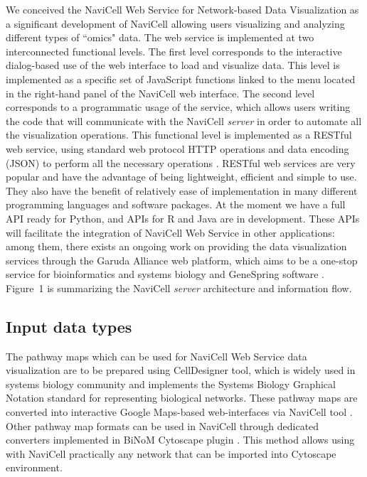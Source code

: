 \documentclass[a4,center,fleqn]{NAR}
\begin{document}
We conceived the NaviCell Web Service for Network-based Data Visualization
as a significant development of NaviCell \cite{kuperstein2013navicell}
allowing users visualizing and analyzing different types of ``omics" data. The web service
is implemented at two interconnected functional levels.
The first level corresponds to the interactive dialog-based
use of the web interface to load and visualize data. This level is implemented
as a specific set of JavaScript functions linked to the menu located
in the right-hand panel of the NaviCell web interface. The second level corresponds to a
programmatic usage of the service, which allows users writing the code that will
communicate with the NaviCell \emph{server} in order to automate all the
visualization operations. This functional level is implemented as a RESTful web
service, using standard web protocol HTTP operations and data encoding (JSON)
to perform all the necessary operations \cite{fielding2002principled}.
RESTful web services are very popular and have the advantage of being
lightweight, efficient and simple to use. They also have the benefit of
relatively ease of implementation in many different programming languages and
software packages. At the moment we have a full API ready for Python, and
APIs for R and Java are in development. These APIs will facilitate the integration
of NaviCell Web Service in other applications: among them, there exists an
ongoing work on providing the data visualization services through the Garuda
Alliance web platform, which aims to be a one-stop service for bioinformatics
and systems biology \cite{ghosh2011software} and GeneSpring software
\cite{Chu2001}. Figure~1 is summarizing the NaviCell \emph{server} architecture
and information flow.

\subsection{Input data types}

The pathway maps which can be used for NaviCell Web Service data visualization
are to be prepared using CellDesigner tool\cite{Funahashi2008}, which is widely used in systems biology
community and implements the Systems Biology Graphical Notation standard \cite{LeNovere2009}
for representing biological networks. These pathway maps are converted into
interactive Google Maps-based web-interfaces via NaviCell tool \cite{kuperstein2013navicell}.
Other pathway map formats can be used in NaviCell through dedicated converters implemented
in BiNoM Cytoscape plugin \cite{Zinovyev2008,Bonnet2013a}.
This method allows using with NaviCell practically any network that can be imported into Cytoscape environment.
\end{document}
